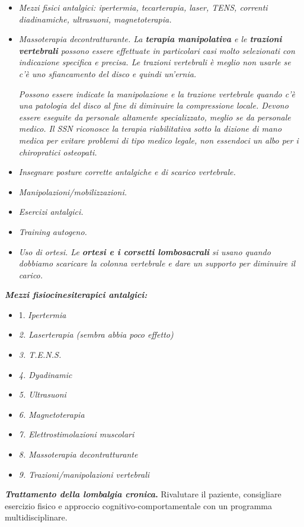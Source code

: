 \begin{itemize}
\item
  \emph{Mezzi fisici antalgici: ipertermia, tecarterapia, laser, TENS,
  correnti diadinamiche, ultrasuoni, magnetoterapia.}
\item
  \emph{Massoterapia decontratturante. La \textbf{terapia manipolativa}
  e le \textbf{trazioni vertebrali} possono essere effettuate in
  particolari casi molto selezionati con indicazione specifica e
  precisa. Le trazioni vertebrali è meglio non usarle se c'è uno
  sfiancamento del disco e quindi un'ernia.}

\emph{Possono essere indicate la manipolazione e la trazione vertebrale
quando c'è una patologia del disco al fine di diminuire la compressione
locale. Devono essere eseguite da personale altamente specializzato,
meglio se da personale medico. Il SSN riconosce la terapia riabilitativa
sotto la dizione di mano medica per evitare problemi di tipo medico
legale, non essendoci un albo per i chiropratici osteopati. }

\item
  \emph{Insegnare posture corrette antalgiche e di scarico vertebrale. }
\item
  \emph{Manipolazioni/mobilizzazioni. }
\item
  \emph{Esercizi antalgici. }
\item
  \emph{Training autogeno.}
\item
  \emph{Uso di ortesi. Le \textbf{ortesi e i corsetti lombosacrali} si
  usano quando dobbiamo scaricare la colonna vertebrale e dare un
  supporto per diminuire il carico. }
\end{itemize}

\textbf{\emph{Mezzi fisiocinesiterapici antalgici: }}
\begin{itemize}
\item 
1. \emph{Ipertermia}
\item 
\emph{2. Laserterapia (sembra abbia poco effetto) }
\item 
\emph{3. T.E.N.S.}
\item 
\emph{4. Dyadinamic}
\item 
\emph{5. Ultrasuoni}
\item 
\emph{6. Magnetoterapia}
\item 
\emph{7. Elettrostimolazioni muscolari}
\item 
\emph{8. Massoterapia decontratturante }
\item 
\emph{9. Trazioni/manipolazioni vertebrali }
\end{itemize}
\textbf{\emph{Trattamento della lombalgia cronica}.} Rivalutare il
paziente, consigliare esercizio fisico e approccio
cognitivo-comportamentale con un programma multidisciplinare.


